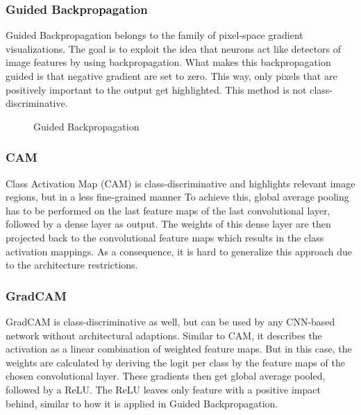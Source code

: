 \documentclass{article}
\begin{document}
\subsubsection{Guided Backpropagation}
Guided Backpropagation belongs to the family of pixel-space gradient visualizations. 
The goal is to exploit the idea that neurons act like detectors of image features by using backpropagation.
What makes this backpropagation guided is that negative gradient are set to zero. This way, only pixels that are positively important to 
the output get highlighted. This method is not class-discriminative.  
\begin{figure}[h]
  \centering
  \hspace{0.5cm}
  \caption{Guided Backpropagation}
\end{figure}
\subsubsection{CAM}
Class Activation Map (CAM) is class-discriminative and highlights relevant image regions, but in a less fine-grained manner
To achieve this, global average pooling has to be performed on the last feature maps of the last convolutional layer, followed by a dense layer as output.
The weights of this dense layer are then projected back to the convolutional feature maps which results in the class activation mappings.
As a consequence, it is hard to generalize this approach due to the architecture restrictions.
\subsubsection{GradCAM}
GradCAM is class-discriminative as well, but can be used by any CNN-based network without architectural adaptions.
Similar to CAM, it describes the activation as a linear combination of weighted feature maps. But in this case, the weights are calculated
by deriving the logit per class by the feature maps of the chosen convolutional layer. These gradients then get global average pooled, followed by a ReLU.
The ReLU leaves only feature with a positive impact behind, similar to how it is applied in Guided Backpropagation.
\end{document}
